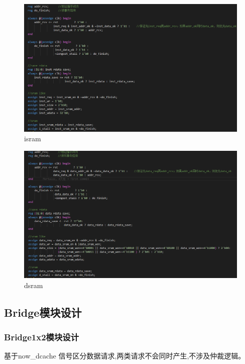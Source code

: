 \begin{figure}
\centering
\includegraphics[width=0.5\linewidth]{image/P11.png}
\caption{isram}
\label{fig:enter-label}
\end{figure}
\begin{figure}
\centering
\includegraphics[width=0.5\linewidth]{image/P12.png}
\caption{dsram}
\label{fig:enter-label}
\end{figure}


\newpage
\begin{flushleft}
\subsection{Bridge模块设计}
\subsubsection{Bridge1x2模块设计}
基于now\_dcache 信号区分数据请求,两类请求不会同时产生,不涉及仲裁逻辑。
\end{flushleft}

